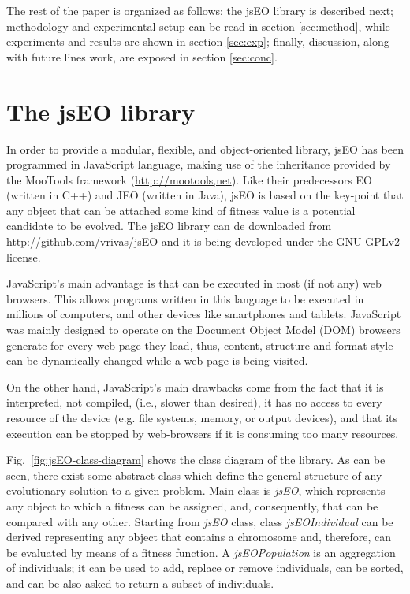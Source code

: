 \documentclass[runningheads,a4paper]{llncs}
\begin{document}


The rest of the paper is organized as follows: the jsEO library is described next;  methodology and experimental setup can be read  in section \ref{sec:method}, while experiments and results are shown in section 
\ref{sec:exp}; finally, discussion, along with future lines work, are exposed in section \ref{sec:conc}.

\section{The jsEO library}
\label{sec:jseo}
In order to provide a modular, flexible, and object-oriented library, jsEO has been programmed in JavaScript language, making use of the inheritance provided by the MooTools framework (\url{http://mootools,net}). Like their predecessors EO (written in C++) and JEO (written in Java), jsEO is based on the key-point that any object that can be attached some kind of fitness value is a potential candidate to be evolved. The jsEO library can de downloaded from \url{http://github.com/vrivas/jsEO} and it is being developed under the GNU GPLv2 license.

JavaScript's main advantage is that can be executed in most (if not any) web browsers. This allows programs written in this language to be executed in millions of computers, and other devices like smartphones and tablets. JavaScript was mainly designed to operate on the Document Object Model (DOM) browsers generate for every web page they load, thus, content, structure and format style can be dynamically changed while a web page is being visited.

On the other hand, JavaScript's main drawbacks come from the fact that it is interpreted, not compiled, (i.e., slower than desired), it has no access to every resource of the device (e.g. file systems,  memory, or output devices), and that its execution can be stopped by web-browsers if it is consuming too many resources.

Fig.~\ref{fig:jsEO-class-diagram} shows the class diagram of the library. As can be seen, there exist some abstract class which define the general structure of any evolutionary solution to a given problem. Main class is \textit{jsEO}, which represents any object to which a fitness can be assigned, and, consequently, that can be compared with any other. Starting from \textit{jsEO} class, class \textit{jsEOIndividual} can be derived representing any object that contains a chromosome and, therefore, can be evaluated by means of a fitness function. A \textit{jsEOPopulation} is an aggregation of individuals; it can be used to add, replace or remove individuals, can be sorted, and can be also asked to return a subset of individuals.
\end{document}
